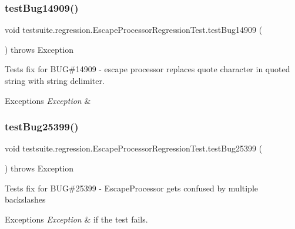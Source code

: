 \subsubsection{\texorpdfstring{test\+Bug14909()}{testBug14909()}}
{\footnotesize\ttfamily void testsuite.\+regression.\+Escape\+Processor\+Regression\+Test.\+test\+Bug14909 (\begin{DoxyParamCaption}{ }\end{DoxyParamCaption}) throws Exception}

Tests fix for B\+UG\#14909 -\/ escape processor replaces quote character in quoted string with string delimiter.


\begin{DoxyExceptions}{Exceptions}
{\em Exception} & \\
\hline
\end{DoxyExceptions}
\mbox{\label{classtestsuite_1_1regression_1_1_escape_processor_regression_test_a807fc950104890375b5291b116c9c45a}} 
\subsubsection{\texorpdfstring{test\+Bug25399()}{testBug25399()}}
{\footnotesize\ttfamily void testsuite.\+regression.\+Escape\+Processor\+Regression\+Test.\+test\+Bug25399 (\begin{DoxyParamCaption}{ }\end{DoxyParamCaption}) throws Exception}

Tests fix for B\+UG\#25399 -\/ Escape\+Processor gets confused by multiple backslashes


\begin{DoxyExceptions}{Exceptions}
{\em Exception} & if the test fails. \\
\hline
\end{DoxyExceptions}
\mbox{\label{classtestsuite_1_1regression_1_1_escape_processor_regression_test_a39062afbb30ff8c361ed8fdfaad6f971}} 
